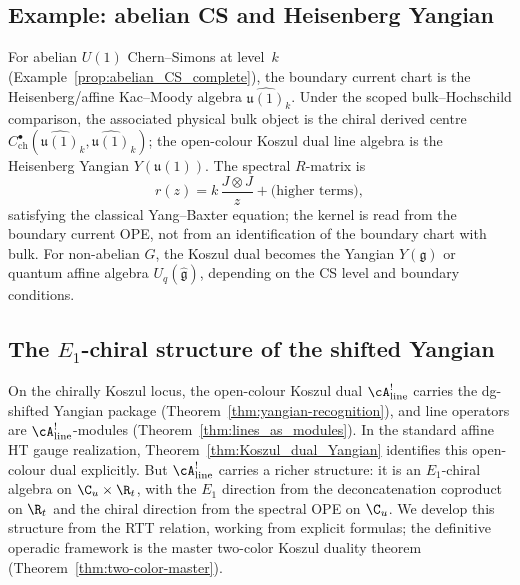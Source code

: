 \subsection{Example: abelian CS and Heisenberg Yangian}

\begin{example}
For abelian $U(1)$ Chern--Simons at level~$k$ (Example~\ref{prop:abelian_CS_complete}), the boundary current chart is the Heisenberg/affine Kac--Moody algebra $\widehat{\mathfrak{u}(1)}_k$. Under the scoped bulk--Hochschild comparison, the associated physical bulk object is the chiral derived centre $C^\bullet_{\mathrm{ch}}(\widehat{\mathfrak{u}(1)}_k,\widehat{\mathfrak{u}(1)}_k)$; the open-colour Koszul dual line algebra is the Heisenberg Yangian $Y(\mathfrak{u}(1))$. The spectral $R$-matrix is
\begin{equation}
r(z) = k \, \frac{J \otimes J}{z} + \text{(higher terms)},
\end{equation}
satisfying the classical Yang--Baxter equation; the kernel is read from the boundary current OPE, not from an identification of the boundary chart with bulk. For non-abelian $G$, the Koszul dual becomes the Yangian $Y(\mathfrak{g})$ or quantum affine algebra $U_q(\widehat{\mathfrak{g}})$, depending on the CS level and boundary conditions.
\end{example}


\subsection{The $E_1$-chiral structure of the shifted Yangian}

On the chirally Koszul locus, the open-colour Koszul dual
$\cA^!_{\mathrm{line}}$ carries the dg-shifted Yangian package
(Theorem~\ref{thm:yangian-recognition}), and line operators
are $\cA^!_{\mathrm{line}}$-modules (Theorem~\ref{thm:lines_as_modules}).
In the standard affine HT gauge realization,
Theorem~\ref{thm:Koszul_dual_Yangian} identifies this
open-colour dual explicitly. But $\cA^!_{\mathrm{line}}$ carries a richer structure: it is an $E_1$-chiral
algebra on $\C_u \times \R_t$, with the $E_1$ direction from
the deconcatenation coproduct on $\R_t$ and the chiral direction
from the spectral OPE on $\C_u$. We develop this structure
from the RTT relation, working from explicit formulas; the
definitive operadic framework is the master two-color Koszul
duality theorem (Theorem~\ref{thm:two-color-master}).

